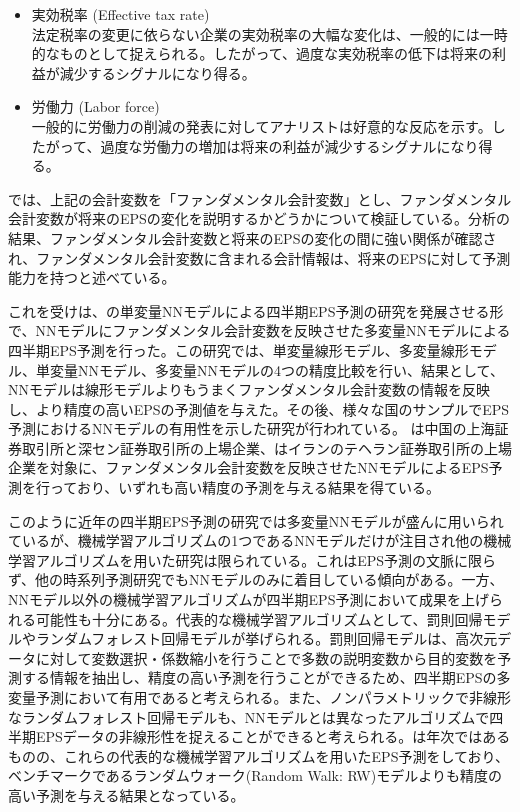 \documentclass[a4paper, 12pt]{jsarticle}
\begin{document}
\begin{itemize}
\item 実効税率 (Effective tax rate) \\
    法定税率の変更に依らない企業の実効税率の大幅な変化は、一般的には一時的なものとして捉えられる。したがって、過度な実効税率の低下は将来の利益が減少するシグナルになり得る。

\item 労働力 (Labor force) \\
    一般的に労働力の削減の発表に対してアナリストは好意的な反応を示す。したがって、過度な労働力の増加は将来の利益が減少するシグナルになり得る。
\end{itemize}

\cite*{abarbanell1997fundamental}では、上記の会計変数を「ファンダメンタル会計変数」とし、ファンダメンタル会計変数が将来のEPSの変化を説明するかどうかについて検証している。分析の結果、ファンダメンタル会計変数と将来のEPSの変化の間に強い関係が確認され、ファンダメンタル会計変数に含まれる会計情報は、将来のEPSに対して予測能力を持つと述べている。

これを受け\cite{zhang2004neural}は、\cite{callen1996neural}の単変量NNモデルによる四半期EPS予測の研究を発展させる形で、NNモデルにファンダメンタル会計変数を反映させた多変量NNモデルによる四半期EPS予測を行った。この研究では、単変量線形モデル、多変量線形モデル、単変量NNモデル、多変量NNモデルの4つの精度比較を行い、結果として、NNモデルは線形モデルよりもうまくファンダメンタル会計変数の情報を反映し、より精度の高いEPSの予測値を与えた。その後、様々な国のサンプルでEPS予測におけるNNモデルの有用性を示した研究が行われている。\cite*{cao2009forecasting} は中国の上海証券取引所と深セン証券取引所の上場企業、\cite{etemadi2015earnings}はイランのテヘラン証券取引所の上場企業を対象に、ファンダメンタル会計変数を反映させたNNモデルによるEPS予測を行っており、いずれも高い精度の予測を与える結果を得ている。

このように近年の四半期EPS予測の研究では多変量NNモデルが盛んに用いられているが、機械学習アルゴリズムの1つであるNNモデルだけが注目され他の機械学習アルゴリズムを用いた研究は限られている。これはEPS予測の文脈に限らず、他の時系列予測研究でもNNモデルのみに着目している傾向がある\citep{ahmed2010empirical}。一方、NNモデル以外の機械学習アルゴリズムが四半期EPS予測において成果を上げられる可能性も十分にある。代表的な機械学習アルゴリズムとして、罰則回帰モデルやランダムフォレスト回帰モデルが挙げられる\citep{hastie2009esl}。罰則回帰モデルは、高次元データに対して変数選択・係数縮小を行うことで多数の説明変数から目的変数を予測する情報を抽出し、精度の高い予測を行うことができるため、四半期EPSの多変量予測において有用であると考えられる。また、ノンパラメトリックで非線形なランダムフォレスト回帰モデル\citep{breiman2001random}も、NNモデルとは異なったアルゴリズムで四半期EPSデータの非線形性を捉えることができると考えられる。\cite*{cao2020fundamental}は年次ではあるものの、これらの代表的な機械学習アルゴリズムを用いたEPS予測をしており、ベンチマークであるランダムウォーク(Random Walk: RW)モデルよりも精度の高い予測を与える結果となっている。
\end{document}
